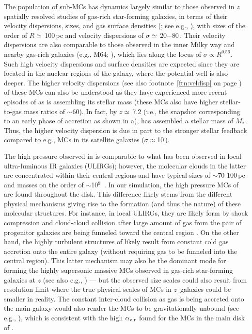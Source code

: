 \IfFileExists{emulateapjlegacy.cls}{\documentclass[iop]{emulateapjlegacy}}{\documentclass[iop]{emulateapj}}
\begin{document}
The population of sub-MCs has dynamics largely
similar to those observed
in $z$ spatially resolved studies of gas-rich star-forming galaxies, in
terms of their velocity dispersions, sizes, and gas surface densities (; see
e.g., \citealt{Swinbank11a}), with sizes of the order of $R\simeq$\,100\,pc and velocity
dispersions of $\sigma\simeq$\,20$-$80\,\kms.
Their velocity dispersions are also comparable to those observed in the inner Milky way and
nearby gas-rich galaxies (e.g., M64; \citealt{Oka01a, Rosolowsky05a, Heyer09a}), which lies
along the locus of $\sigma\propto R^{0.56}$.
Such high velocity dispersions and surface densities are expected since
they are located in the nuclear regions of the
galaxy, where the potential well is also deeper. The higher velocity dispersions (see also 
footnote~\ref{ftn:veldisp} on page \pageref{ftn:veldisp})
of these MCs can also be understood as they have experienced more recent episodes
of \SF as \flower is assembling its stellar mass (these MCs also have higher stellar-to-gas mass ratios of $\sim$60).
In fact, by $z\simeq$\,7.2 (i.e., the snapshot corresponding to an early phase of accretion as
shown in a), \flower has assembled
a stellar mass of $M_*$\,\Msun. Thus, the higher velocity dispersion
is due in part to the stronger stellar feedback compared to e.g., MCs in its satellite galaxies ($\sigma\approx$10\,\kms).

The high pressure observed in \flower is comparable to what has been 
observed in local ultra-luminous IR galaxies (ULIRGs); however, the
molecular clouds in the latter are concentrated within their 
central regions and have typical sizes of $\sim$70-100\,pc and masses on the order of $\sim$10$^9$\,\Msun
\citep{Downes98a, Sakamoto08a}. In our simulation, the high pressure MCs of \flower are
found throughout the disk. This difference likely stems from the different physical mechanisms giving rise
to the formation (and thus the nature) of these molecular structures.
For instance, in local ULIRGs, they are likely form by shock compression and cloud-cloud
collision after large amount of gas from the pair of progenitor galaxies
are being funneled toward the central region \citep{Tan00a, Wu18a}.  %
On the other hand, the highly turbulent structures of \flower likely result from 
constant cold gas accretion onto the entire galaxy (without
requiring gas to be funneled into the central region).
This latter mechanism may also be the dominant mode for forming the highly supersonic massive MCs observed
in gas-rich star-forming galaxies at $z$ (see also e.g., \citealt{Swinbank11a}) --- but the observed 
size scales could also result from resolution limit where the true physical scales of MCs in
$z$\, galaxies could be smaller in reality.
The constant inter-cloud collision as gas is being accreted onto the main galaxy would also render
the MCs to be gravitationally unbound (see e.g., \citealt{Dobbs11a}), which is 
consistent with the high $\alpha_{\rm vir}$ found for the MCs in the main disk of \flower.
\end{document}
